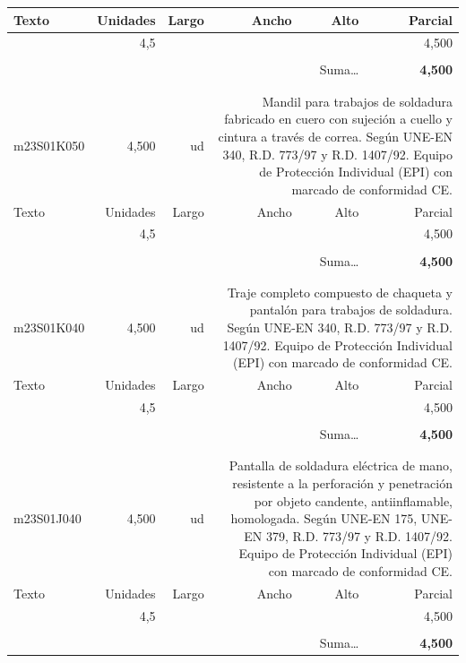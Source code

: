 \documentclass{book}%
\begin{document}
\begin{longtable}{lrrrrr}
Texto&Unidades&Largo&Ancho&Alto&Parcial\\%
\hline%
\multicolumn{1}{p{3.5cm}}{ }&4,5&&&&     4,500\\%
&&&&&\\%
\multicolumn{5}{r}{Suma\ldots}&\textbf{     4,500}\\%
\hline%
&&&&&\\%
&&&&&\\%
m23S01K050&     4,500& ud&\multicolumn{3}{p{6cm}}{\scriptsize Mandil para trabajos de soldadura fabricado en cuero con sujeción a cuello y cintura a través de correa. Según UNE-EN 340, R.D. 773/97 y R.D. 1407/92. Equipo de Protección Individual (EPI) con marcado de conformidad CE.\normalsize}\\%
Texto&Unidades&Largo&Ancho&Alto&Parcial\\%
\hline%
\multicolumn{1}{p{3.5cm}}{ }&4,5&&&&     4,500\\%
&&&&&\\%
\multicolumn{5}{r}{Suma\ldots}&\textbf{     4,500}\\%
\hline%
&&&&&\\%
&&&&&\\%
m23S01K040&     4,500& ud&\multicolumn{3}{p{6cm}}{\scriptsize Traje completo compuesto de chaqueta y pantalón para trabajos de soldadura. Según UNE-EN 340, R.D. 773/97 y R.D. 1407/92. Equipo de Protección Individual (EPI) con marcado de conformidad CE.\normalsize}\\%
Texto&Unidades&Largo&Ancho&Alto&Parcial\\%
\hline%
\multicolumn{1}{p{3.5cm}}{ }&4,5&&&&     4,500\\%
&&&&&\\%
\multicolumn{5}{r}{Suma\ldots}&\textbf{     4,500}\\%
\hline%
&&&&&\\%
&&&&&\\%
m23S01J040&     4,500& ud&\multicolumn{3}{p{6cm}}{\scriptsize Pantalla de soldadura eléctrica de mano, resistente a la perforación y penetración por objeto candente, antiinflamable, homologada. Según UNE-EN 175, UNE-EN 379, R.D. 773/97 y R.D. 1407/92. Equipo de Protección Individual (EPI) con marcado de conformidad CE.\normalsize}\\%
Texto&Unidades&Largo&Ancho&Alto&Parcial\\%
\hline%
\multicolumn{1}{p{3.5cm}}{ }&4,5&&&&     4,500\\%
&&&&&\\%
\multicolumn{5}{r}{Suma\ldots}&\textbf{     4,500}\\%

\end{longtable}
\end{document}
